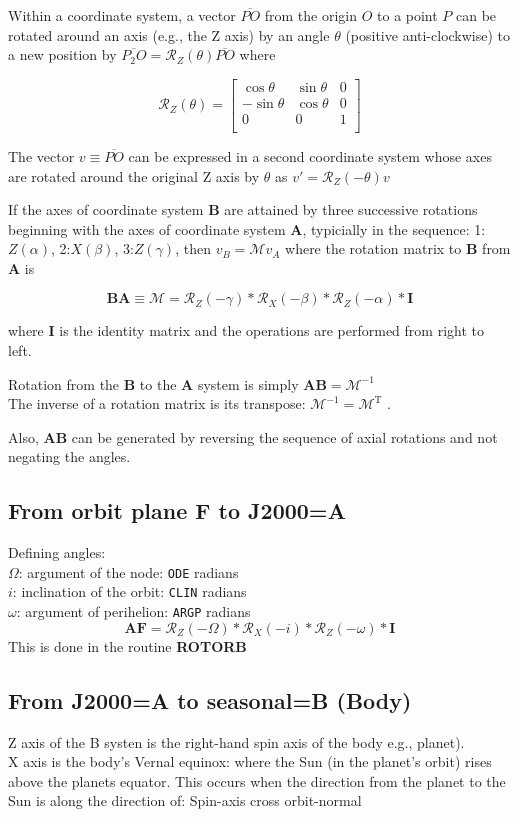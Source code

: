 \documentclass[draft]{article}
\newcommand{\qbn}{\begin{equation}}      %
\newcommand{\qen}{\end{equation}}
\newcommand{\qi}{\\ \hspace*{2.em}}      %
\newcommand{\qv}{\overline}       %
\newcommand{\np}{\textbf}  %
\newcommand{\nv}{\texttt}  %
\begin{document}
Within a coordinate system, a vector $ \qv{PO}$ from the origin $O$ to a point
$P$ can be rotated around an axis (e.g., the Z axis) by an angle $\theta$
(positive anti-clockwise) to a new position by $ \qv{P_2O}=
\mathcal{R}_Z(\theta) \qv{PO} $ where

\qbn  \mathcal{R}_Z(\theta) = \left[ \begin{array}{ccc} 
  \cos \theta & \sin \theta & 0 \\
- \sin \theta & \cos \theta & 0 \\  
        0     &   0         & 1 \\  \end{array} \right] \qen 

The vector $v \equiv \qv{PO}$ can be expressed in a second coordinate system
whose axes are rotated around the original Z axis by $\theta$ as $v'=
\mathcal{R}_Z(-\theta) v$

If the axes of coordinate system \textbf{B} are attained by three successive
rotations beginning with the axes of coordinate system \textbf{A}, typicially in
the sequence: 1:$Z(\alpha)$, 2:$X(\beta)$, 3:$Z(\gamma)$, then $v_B=\mathcal{M}
v_A$ where the rotation matrix to \textbf{B} from \textbf{A} is

\qbn \mathbf{BA} \equiv \mathcal{M}=   \mathcal{R}_Z(-\gamma) \ast \mathcal{R}_X(-\beta)  \ast \mathcal{R}_Z(-\alpha)  \ast \mathbf{I} \qen 

where \textbf{I} is the identity matrix and the operations are performed from right to left.

Rotation from the \textbf{B} to the \textbf{A} system is simply 
\textbf{AB}$=\mathcal{M}^{-1} $ 
\qi The inverse of a rotation matrix is its transpose:
    $\mathcal{M}^{-1}= \mathcal{M}^{\mathrm{T}}$ . 

Also, \textbf{AB} can be generated by reversing the sequence of axial rotations
and not negating the angles.

\subsection{From orbit plane F  to J2000=A}
Defining angles:
\qi $\Omega$: argument of the node: \nv{ODE} radians
\qi $i$: inclination of the orbit: \nv{CLIN} radians
\qi $\omega$: argument of perihelion: \nv{ARGP} radians
\qbn \mathbf{AF} =   \mathcal{R}_Z(-\Omega) \ast 
\mathcal{R}_X(-i)  \ast \mathcal{R}_Z(-\omega)  \ast \mathbf{I} \qen 
This is done in the routine \np{ROTORB}

\subsection{From J2000=A to seasonal=B (Body)}
Z axis of the B systen is the right-hand spin axis of the body e.g., planet).
\\ X axis is the body's Vernal equinox: where the Sun (in the planet's orbit) rises above the planets equator. This occurs when the direction from the planet to the Sun is along the direction of: Spin-axis cross orbit-normal  
\end{document}

